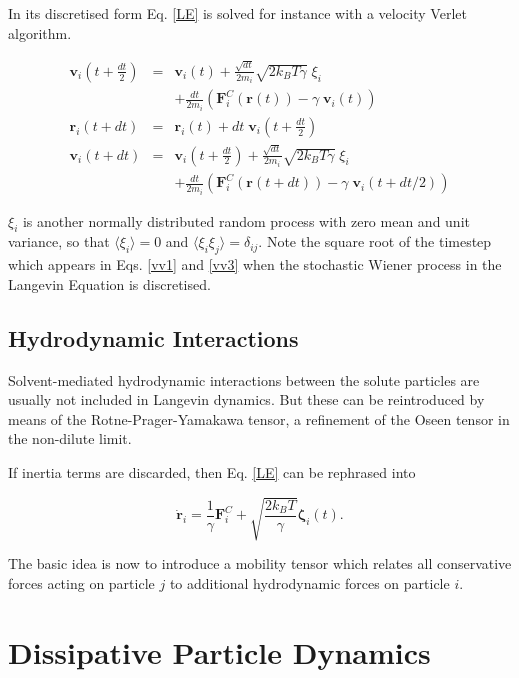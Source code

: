 \documentclass[8.5pt,twoside,twocolumn]{article}
\newcommand{\beq}{\begin{equation}}
\newcommand{\eeq}{\end{equation}}
\newcommand{\beqa}{\begin{eqnarray}}
\newcommand{\eeqa}{\end{eqnarray}}
\begin{document}
In its discretised form Eq. \ref{LE} is solved for instance with a velocity Verlet algorithm.

\beqa
\mathbf{v}_i(t+\frac{dt}{2})&=&\mathbf{v}_i(t)+ \frac{\sqrt{dt}}{2 m_i} \sqrt{2 k_B T \gamma}\; \xi_i \nonumber\\
&& + \frac{dt}{2 m_i} (\mathbf{F}_i^C(\mathbf{r}(t)) -\gamma\; \mathbf{v}_i(t))\label{vv1} \\
\mathbf{r}_i(t+dt)&=& \mathbf{r}_i(t) + dt\;\mathbf{v}_i(t+\frac{dt}{2})\label{vv2}\\ 
\mathbf{v}_i(t+dt)&=& \mathbf{v}_i(t+\frac{dt}{2}) + \frac{\sqrt{dt}}{2 m_i} \sqrt{2 k_B T \gamma}\; \xi_i\nonumber\\
&& + \frac{dt}{2 m_i} (\mathbf{F}_i^C(\mathbf{r}(t+dt)) -\gamma\; \mathbf{v}_i(t+dt/2))\label{vv3}
\eeqa

$\xi_i$ is another normally distributed random process with zero mean and unit variance, 
so that $\langle \xi_i \rangle=0$ and $\langle \xi_i \xi_j\rangle=\delta_{ij}$. 
Note the square root of the timestep which appears in Eqs. \ref{vv1} and \ref{vv3} 
when the stochastic Wiener process in the Langevin Equation is discretised.

\subsection{Hydrodynamic Interactions}

Solvent-mediated hydrodynamic interactions between the solute particles are usually not included
 in Langevin dynamics. But these can be reintroduced by means of the Rotne-Prager-Yamakawa tensor, 
a refinement of the Oseen tensor in the non-dilute limit. 

If inertia terms are discarded, then Eq. \ref{LE} can be rephrased into

\beq
\dot{\mathbf{r}}_i = \frac{1}{\gamma} \mathbf{F}_i^C +\sqrt{\frac{2 k_B T}{\gamma}} \mathbf{\zeta}_i(t).
\eeq

The basic idea is now to introduce a mobility tensor which relates all conservative forces acting on particle $j$ to 
additional hydrodynamic forces on particle $i$. 


\section{Dissipative Particle Dynamics}
\end{document}
